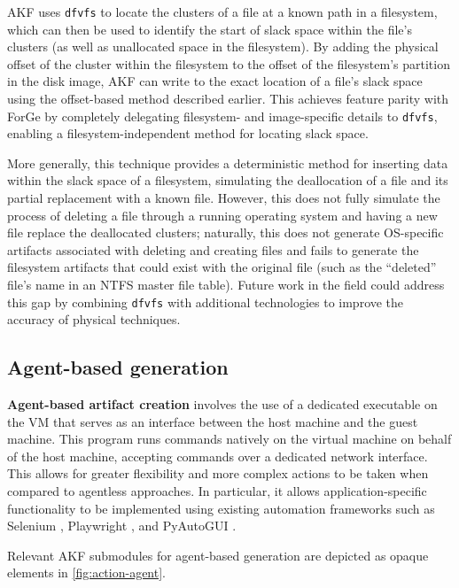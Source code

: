 AKF uses \passthrough{\lstinline!dfvfs!} to locate the clusters of a
file at a known path in a filesystem, which can then be used to identify
the start of slack space within the file's clusters (as well as
unallocated space in the filesystem). By adding the physical offset of
the cluster within the filesystem to the offset of the filesystem's
partition in the disk image, AKF can write to the exact location of a
file's slack space using the offset-based method described earlier. This
achieves feature parity with ForGe by completely delegating filesystem-
and image-specific details to \passthrough{\lstinline!dfvfs!}, enabling
a filesystem-independent method for locating slack space.

More generally, this technique provides a deterministic method for
inserting data within the slack space of a filesystem, simulating the
deallocation of a file and its partial replacement with a known file.
However, this does not fully simulate the process of deleting a file
through a running operating system and having a new file replace the
deallocated clusters; naturally, this does not generate OS-specific
artifacts associated with deleting and creating files and fails to
generate the filesystem artifacts that could exist with the original
file (such as the ``deleted'' file's name in an NTFS master file table).
Future work in the field could address this gap by combining
\passthrough{\lstinline!dfvfs!} with additional technologies to improve
the accuracy of physical techniques.

\subsection{Agent-based generation}\label{agent-based-generation}

\textbf{Agent-based artifact creation} involves the use of a dedicated
executable on the VM that serves as an interface between the host
machine and the guest machine. This program runs commands natively on
the virtual machine on behalf of the host machine, accepting commands
over a dedicated network interface. This allows for greater flexibility
and more complex actions to be taken when compared to agentless
approaches. In particular, it allows application-specific functionality
to be implemented using existing automation frameworks such as Selenium
\cite{SeleniumHQSelenium2025}, Playwright
\cite{MicrosoftPlaywrightpython2025}, and PyAutoGUI
\cite{sweigartAsweigartPyautogui2025}.

Relevant AKF submodules for agent-based generation are depicted as
opaque elements in \autoref{fig:action-agent}.

